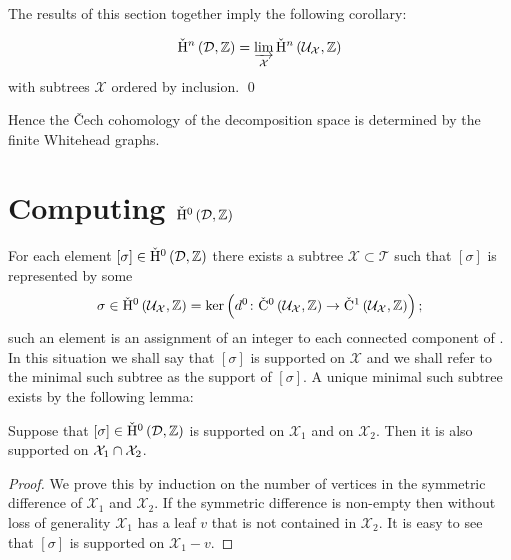 The results of this section together imply the following corollary:

\begin{cor}
\begin{equation}
\check{\mathrm{H}}{}^n\left(\mathcal{D}, \mathbb{Z}\right) = \varinjlim_\mathcal{X}\check{\mathrm{H}}{}^n
  \left(\mathcal{U}_\mathcal{X}, \mathbb{Z}\right)
\end{equation}
with subtrees $\mathcal{X}$ ordered by inclusion. \qed \end{cor} 

Hence the \v{C}ech cohomology of the decomposition space is determined by the
finite Whitehead graphs.

\section{Computing $\check{\mathrm{H}}{}^0\left(\mathcal{D}, \mathbb{Z} \right)$}\label{sec:0th}

For each element $\left[\sigma\right] \in \check{\mathrm{H}}{}^0\left(\mathcal{D},
\mathbb{Z}\right)$ there exists a subtree $\mathcal{X} \subset \mathcal{T}$
such that $\left[\sigma\right]$ is represented by some
\begin{equation}
\sigma \in \check{\mathrm{H}}{}^0\left(\mathcal{U}_\mathcal{X}, \mathbb{Z}\right) = \ker\left(
d^0 \colon \check{\mathrm{C}}{}^0\left(\mathcal{U}_\mathcal{X}, \mathbb{Z}\right) \to
\check{\mathrm{C}}{}^1\left(\mathcal{U}_\mathcal{X}, \mathbb{Z}\right)\right);
\end{equation}
such an element is an assignment of an integer to each connected component of
. In this situation we shall say that $\left[\sigma\right]$
is supported on $\mathcal{X}$ and we shall refer to the minimal such subtree
as the support of $\left[\sigma\right]$. A unique minimal such subtree exists
by the following lemma:

\begin{lem}\label{lem:intersections} Suppose that $\left[\sigma\right] \in
\check{\mathrm{H}}{}^0\left(\mathcal{D}, \mathbb{Z}\right)$ is supported on $\mathcal{X}_1$
and on $\mathcal{X}_2$. Then it is also supported on $\mathcal{X}_1
\cap \mathcal{X}_2$.\end{lem}

\begin{proof} We prove this by induction on the number of vertices in the
symmetric difference of $\mathcal{X}_1$ and $\mathcal{X}_2$. If the
symmetric difference is non-empty then without loss of generality
$\mathcal{X}_1$ has a leaf $v$ that is not contained in $\mathcal{X}_2$.
It is easy to see that $\left[\sigma\right]$ is supported on $\mathcal{X}_1
- v$.\end{proof}

